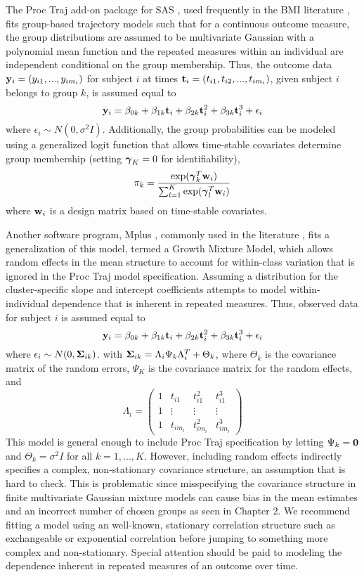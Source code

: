 The Proc Traj add-on package for SAS \cite{jones2001}, used frequently in the BMI literature \cite{pryor2011,carter2012}, fits group-based trajectory models such that for a continuous outcome measure, the group distributions are assumed to be multivariate Gaussian with a polynomial mean function and the repeated measures within an individual are independent conditional on the group membership. Thus, the outcome data $\mathbf y_{i} = (y_{i1},...,y_{im_{i}})$ for subject $i$ at times $\mathbf t_{i} = (t_{i1},t_{i2},...,t_{im_{i}})$, given subject $i$ belongs to group $k$, is assumed equal to
$$\mathbf y_{i} = \beta_{0k}+\beta_{1k} \mathbf t_{i} + \beta_{2k}\mathbf t_{i}^{2}+ \beta_{3k} \mathbf t_{i}^{3} + \epsilon_{i}$$
where $\epsilon_{i}\sim N(0,\sigma^{2}I)$. Additionally, the group probabilities can be modeled using a generalized logit function that allows time-stable covariates determine group membership (setting $\boldsymbol\gamma_{K}=0$ for identifiability),
$$\pi_{k}=\frac{\exp(\boldsymbol\gamma_{k}^{T}\mathbf w_{i})}{\sum^{K}_{l=1}\exp(\boldsymbol\gamma_{l}^{T}\mathbf w_{i})}$$
where $\mathbf w_{i}$ is a design matrix based on time-stable covariates. 

Another software program, Mplus \cite{muthen2010}, commonly used in the literature \cite{li2007,garden2012}, fits a generalization of this model, termed a Growth Mixture Model, which allows random effects in the mean structure to account for within-class variation that is ignored in the Proc Traj model specification. Assuming a distribution for the cluster-specific slope and intercept coefficients attempts to model within-individual dependence that is inherent in repeated measures. Thus, observed data for subject $i$ is assumed equal to
$$\mathbf y_{i} = \beta_{0k}+\beta_{1k} \mathbf t_{i} + \beta_{2k}\mathbf t_{i}^{2}+ \beta_{3k} \mathbf t_{i}^{3} + \epsilon_{i}$$
where $\epsilon_{i}\sim N(0,\boldsymbol\Sigma_{ik})$. 
with $\boldsymbol\Sigma_{ik}=\Lambda_{i}\Psi_{k}\Lambda_{i}^{T}+\Theta_{k}$, where $\Theta_{k}$ is the covariance matrix of the random errors, $\Psi_{K}$ is the covariance matrix for the random effects, and $$\Lambda_{i}=\left(\begin{array}{cccc}1&t_{i1}&t_{i1}^{2}&t_{i1}^{3}\\ 1&\vdots&\vdots&\vdots\\ 1&t_{im_{i}}&t_{im_{i}}^{2}&t_{im_{i}}^{3} \end{array} \right)$$
This model is general enough to include Proc Traj specification by letting $\Psi_{k}=\mathbf 0$ and $\Theta_{k}=\sigma^{2}I$ for all $k=1,...,K$. However, including random effects indirectly specifies a complex, non-stationary covariance structure, an assumption that is hard to check. This is problematic since misspecifying the covariance structure in finite multivariate Gaussian mixture models can cause bias in the mean estimates and an incorrect number of chosen groups as seen in Chapter 2. We recommend fitting a model using an well-known, stationary correlation structure such as exchangeable or exponential correlation before jumping to something more complex and non-stationary. Special attention should be paid to modeling the dependence inherent in repeated measures of an outcome over time.

